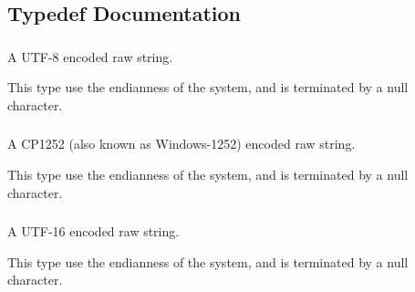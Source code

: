 \subsection{Typedef Documentation}
\hypertarget{group___fa_string_ga3f817d24799e6924bc6a5186cd184fd8}{
\subsubsection[{fa\-\_\-string\-\_\-utf8\-\_\-t}]{}}\label{group___fa_string_ga3f817d24799e6924bc6a5186cd184fd8}


A U\-T\-F-\/8 encoded raw string. 

This type use the endianness of the system, and is terminated by a null character. \hypertarget{group___fa_string_ga8da3eea12a368d4c9d82c11c3dc6b9b6}{
\subsubsection[{fa\-\_\-string\-\_\-cp1252\-\_\-t}]{}}\label{group___fa_string_ga8da3eea12a368d4c9d82c11c3dc6b9b6}


A C\-P1252 (also known as Windows-\/1252) encoded raw string. 

This type use the endianness of the system, and is terminated by a null character. \hypertarget{group___fa_string_ga8187bab75e77f0bbeeaf7ec2992cf7a9}{
\subsubsection[{fa\-\_\-string\-\_\-utf16\-\_\-t}]{}}\label{group___fa_string_ga8187bab75e77f0bbeeaf7ec2992cf7a9}


A U\-T\-F-\/16 encoded raw string. 

This type use the endianness of the system, and is terminated by a null character. \hypertarget{group___fa_string_ga3e5927ccdebcd9dee40aa6af077662ae}{
\subsubsection[{fa\-\_\-string\-\_\-utf32\-\_\-t}]{}}\label{group___fa_string_ga3e5927ccdebcd9dee40aa6af077662ae}


